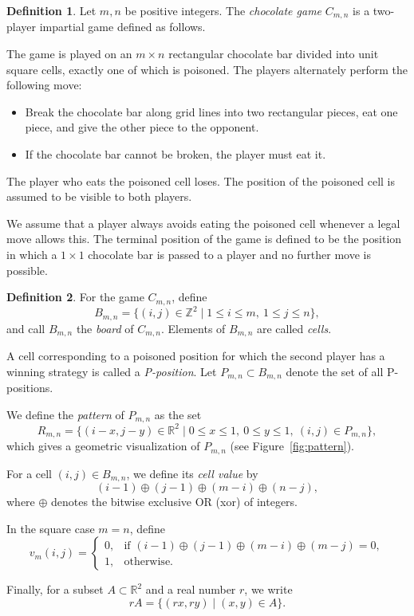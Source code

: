\documentclass{article}
\theoremstyle{definition}
\newtheorem{definition}{Definition}[section]
\theoremstyle{plain}
\theoremstyle{remark}
\begin{document}
\begin{definition}
Let $m,n$ be positive integers.
The \emph{chocolate game} $C_{m,n}$ is a two-player impartial game defined as follows.

The game is played on an $m \times n$ rectangular chocolate bar divided into unit square cells,
exactly one of which is poisoned.
The players alternately perform the following move:
\begin{itemize}
  \item Break the chocolate bar along grid lines into two rectangular pieces,
        eat one piece, and give the other piece to the opponent.
  \item If the chocolate bar cannot be broken, the player must eat it.
\end{itemize}
The player who eats the poisoned cell loses.
The position of the poisoned cell is assumed to be visible to both players.

We assume that a player always avoids eating the poisoned cell whenever a legal move allows this.
The terminal position of the game is defined to be the position in which a $1 \times 1$ chocolate bar
is passed to a player and no further move is possible.
\end{definition}

\begin{definition}
For the game $C_{m,n}$, define
\[
B_{m,n}=\{(i,j)\in \mathbb{Z}^2 \mid 1\le i\le m,\ 1\le j\le n\},
\]
and call $B_{m,n}$ the \emph{board} of $C_{m,n}$.
Elements of $B_{m,n}$ are called \emph{cells}.

A cell corresponding to a poisoned position for which the second player has a winning strategy
is called a \emph{P-position}.
Let $P_{m,n}\subset B_{m,n}$ denote the set of all P-positions.

We define the \emph{pattern} of $P_{m,n}$ as the set
\[
R_{m,n}
=
\bigl\{(i-x,j-y)\in\mathbb{R}^2
\mid 0\le x\le1,\ 0\le y\le1,\ (i,j)\in P_{m,n}\bigr\},
\]
which gives a geometric visualization of $P_{m,n}$ (see Figure~\ref{fig:pattern}).

For a cell $(i,j)\in B_{m,n}$, we define its \emph{cell value} by
\[
(i-1)\oplus(j-1)\oplus(m-i)\oplus(n-j),
\]
where $\oplus$ denotes the bitwise exclusive OR (xor) of integers.

In the square case $m=n$, define
\[
v_m(i,j)=
\begin{cases}
0, & \text{if } (i-1)\oplus(j-1)\oplus(m-i)\oplus(m-j)=0,\\
1, & \text{otherwise}.
\end{cases}
\]

Finally, for a subset $A\subset\mathbb{R}^2$ and a real number $r$, we write
\[
rA=\{(rx,ry)\mid(x,y)\in A\}.
\]
\end{definition}
\end{document}
